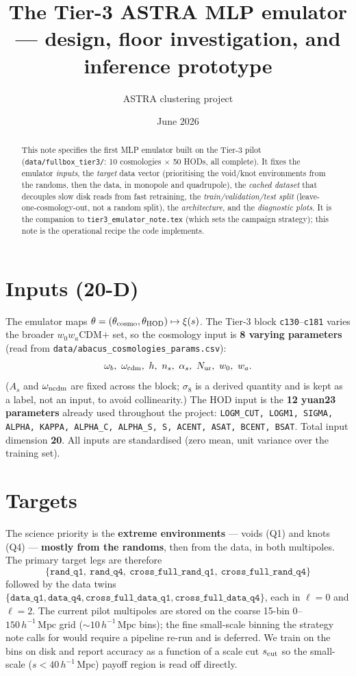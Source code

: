 \documentclass[11pt]{article}
\title{The Tier-3 ASTRA MLP emulator --- design, floor investigation, and inference prototype}
\author{ASTRA clustering project}\date{June 2026}
\newcommand{\Mpch}{\,h^{-1}\,\mathrm{Mpc}}
\newcommand{\code}[1]{\texttt{#1}}
\begin{document}
\maketitle

\begin{abstract}
This note specifies the first MLP emulator built on the Tier-3 pilot
(\code{data/fullbox\_tier3/}: 10 cosmologies $\times$ 50 HODs, all complete). It
fixes the emulator \emph{inputs}, the \emph{target} data vector (prioritising the
void/knot environments from the randoms, then the data, in monopole and
quadrupole), the \emph{cached dataset} that decouples slow disk reads from fast
retraining, the \emph{train/validation/test split} (leave-one-cosmology-out, not
a random split), the \emph{architecture}, and the \emph{diagnostic plots}. It is
the companion to \code{tier3\_emulator\_note.tex} (which sets the campaign
strategy); this note is the operational recipe the code implements.
\end{abstract}

\section{Inputs (20-D)}
The emulator maps $\theta = (\theta_{\rm cosmo},\theta_{\rm HOD}) \mapsto
\xi(s)$. The Tier-3 block \code{c130}--\code{c181} varies the broader
$w_0w_a$CDM$+$ set, so the cosmology input is \textbf{8 varying parameters}
(read from \code{data/abacus\_cosmologies\_params.csv}):
\[
\omega_b,\ \omega_{\rm cdm},\ h,\ n_s,\ \alpha_s,\ N_{\rm ur},\ w_0,\ w_a .
\]
($A_s$ and $\omega_{\rm ncdm}$ are fixed across the block; $\sigma_8$ is a
derived quantity and is kept as a label, not an input, to avoid collinearity.)
The HOD input is the \textbf{12 yuan23 parameters} already used throughout the
project: \code{LOGM\_CUT, LOGM1, SIGMA, ALPHA, KAPPA, ALPHA\_C, ALPHA\_S, S,
ACENT, ASAT, BCENT, BSAT}. Total input dimension \textbf{20}. All inputs are
standardised (zero mean, unit variance over the training set).

\section{Targets}
The science priority is the \textbf{extreme environments} --- voids (Q1) and
knots (Q4) --- \textbf{mostly from the randoms}, then from the data, in both
multipoles. The primary target legs are therefore
\[
\{\code{rand\_q1},\ \code{rand\_q4},\ \code{cross\_full\_rand\_q1},\ \code{cross\_full\_rand\_q4}\}
\]
followed by the data twins
$\{\code{data\_q1},\code{data\_q4},\code{cross\_full\_data\_q1},\code{cross\_full\_data\_q4}\}$,
each in $\ell=0$ and $\ell=2$. The current pilot multipoles are stored on the
coarse 15-bin $0$--$150\Mpch$ grid ($\sim 10\Mpch$ bins); the fine small-scale
binning the strategy note calls for would require a pipeline re-run and is
deferred. We train on the bins on disk and report accuracy as a function of a
scale cut $s_{\rm cut}$ so the small-scale ($s<40\Mpch$) payoff region is read
off directly.
\end{document}
